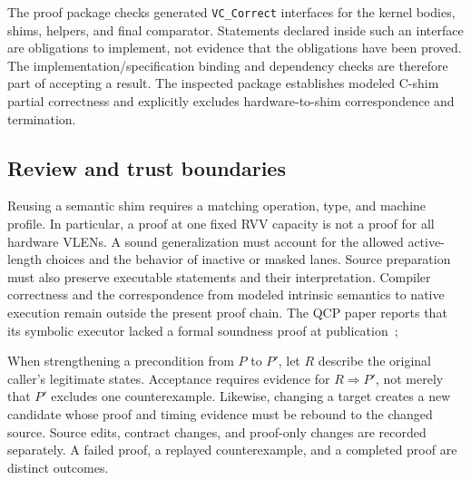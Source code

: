 The proof package checks generated \texttt{VC\_Correct} interfaces for the kernel bodies, shims, helpers, and final comparator. Statements declared inside such an interface are obligations to implement, not evidence that the obligations have been proved. The implementation/specification binding and dependency checks are therefore part of accepting a result. The inspected package establishes modeled C-shim partial correctness and explicitly excludes hardware-to-shim correspondence and termination. 

\subsection{Review and trust boundaries}
Reusing a semantic shim requires a matching operation, type, and machine profile. In particular, a proof at one fixed RVV capacity is not a proof for all hardware VLENs. A sound generalization must account for the allowed active-length choices and the behavior of inactive or masked lanes. Source preparation must also preserve executable statements and their interpretation. Compiler correctness and the correspondence from modeled intrinsic semantics to native execution remain outside the present proof chain. The QCP paper reports that its symbolic executor lacked a formal soundness proof at publication~\cite{qcp}; 

When strengthening a precondition from $P$ to $P'$, let $R$ describe the original caller's legitimate states. Acceptance requires evidence for $R\Rightarrow P'$, not merely that $P'$ excludes one counterexample. Likewise, changing a target creates a new candidate whose proof and timing evidence must be rebound to the changed source. Source edits, contract changes, and proof-only changes are recorded separately. A failed proof, a replayed counterexample, and a completed proof are distinct outcomes.
